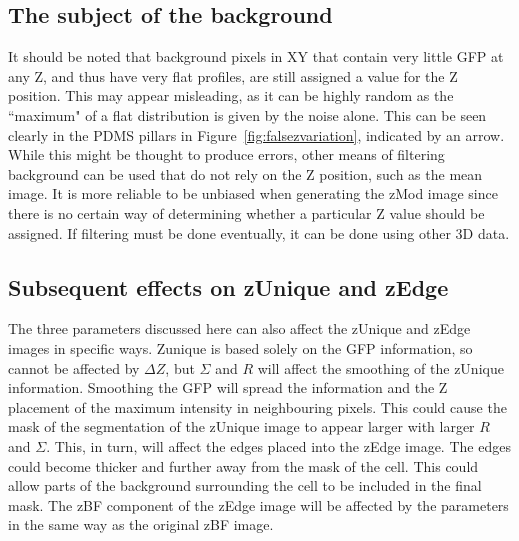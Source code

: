 \subsection{The subject of the background}

It should be noted that background pixels in XY that contain very little GFP at any Z, and thus have very flat profiles, are still assigned a value for the Z position. This may appear misleading, as it can be highly random as the ``maximum" of a flat distribution is given by the noise alone. This can be seen clearly in the PDMS pillars in Figure~\ref{fig:falsezvariation}, indicated by an arrow. While this might be thought to produce errors, other means of filtering background can be used that do not rely on the Z position, such as the mean image. It is more reliable to be unbiased when generating the zMod image since there is no certain way of determining whether a particular Z value should be assigned. If filtering must be done eventually, it can be done using other 3D data.

\subsection{Subsequent effects on zUnique and zEdge}

The three parameters discussed here can also affect the zUnique and zEdge images in specific ways. Zunique is based solely on the GFP information, so cannot be affected by $\Delta Z$, but $\Sigma$ and $R$ will affect the smoothing of the zUnique information. Smoothing the GFP will spread the information and the Z placement of the maximum intensity in neighbouring pixels. This could cause the mask of the segmentation of the zUnique image to appear larger with larger $R$ and $\Sigma$. This, in turn, will affect the edges placed into the zEdge image. The edges could become thicker and further away from the mask of the cell. This could allow parts of the background surrounding the cell to be included in the final mask. The zBF component of the zEdge image will be affected by the parameters in the same way as the original zBF image.

